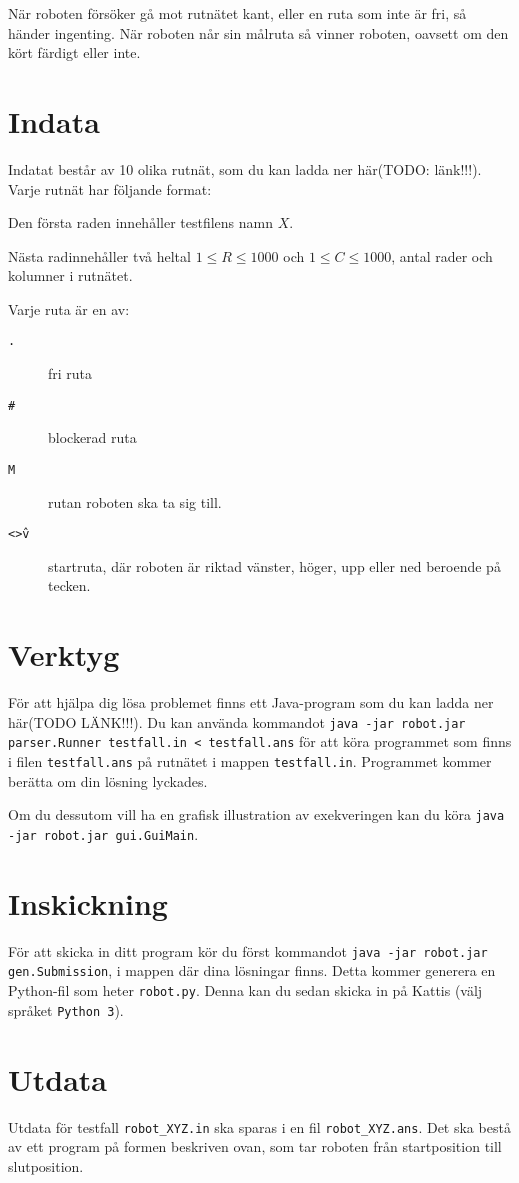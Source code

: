 När roboten försöker gå mot rutnätet kant, eller en ruta som inte är fri, så händer ingenting. När roboten når sin målruta så vinner roboten, oavsett om den kört färdigt eller inte.

\section*{Indata}
Indatat består av 10 olika rutnät, som du kan ladda ner här(TODO: länk!!!). Varje rutnät har följande format:

Den första raden innehåller testfilens namn $X$.

Nästa radinnehåller två heltal $1 \le R \le 1000$ och $1 \le C \le 1000$, antal rader och kolumner i rutnätet.

Varje ruta är en av:
\begin{description}
  \item[\texttt{.}] fri ruta
  \item[\texttt{\#}] blockerad ruta
  \item[\texttt{M}] rutan roboten ska ta sig till.
  \item[\texttt{<>\^v}] startruta, där roboten är riktad vänster, höger, upp eller ned beroende på tecken.
\end{description}

\section*{Verktyg}
För att hjälpa dig lösa problemet finns ett Java-program som du kan ladda ner här(TODO LÄNK!!!). Du kan använda kommandot \texttt{java -jar robot.jar parser.Runner testfall.in < testfall.ans} för att köra programmet som finns i filen \texttt{testfall.ans} på rutnätet i mappen \texttt{testfall.in}. Programmet kommer berätta om din lösning lyckades.

Om du dessutom vill ha en grafisk illustration av exekveringen kan du köra \texttt{java -jar robot.jar gui.GuiMain}.

\section*{Inskickning}
För att skicka in ditt program kör du först kommandot \texttt{java -jar robot.jar gen.Submission}, i mappen där dina lösningar finns. Detta kommer generera en Python-fil som heter \texttt{robot.py}. Denna kan du sedan skicka in på Kattis (välj språket \texttt{Python 3}).

\section*{Utdata}
Utdata för testfall \texttt{robot\_XYZ.in} ska sparas i en fil \texttt{robot\_XYZ.ans}. Det ska bestå av ett program på formen beskriven ovan, som tar roboten från startposition till slutposition.

